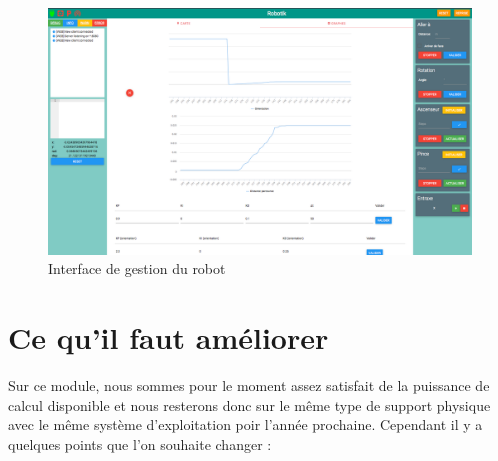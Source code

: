 	
	\begin{figure}
		\centering
		\includegraphics[width=150mm]{assets/debug.png}%
		\caption{Interface de gestion du robot}%
	\end{figure}


	\newpage

	\section{Ce qu'il faut améliorer}
	Sur ce module, nous sommes pour le moment assez satisfait de la puissance de calcul disponible et nous resterons donc sur le même type de support physique avec le même système d'exploitation poir l'année prochaine. Cependant il y a quelques points que l'on souhaite changer :

